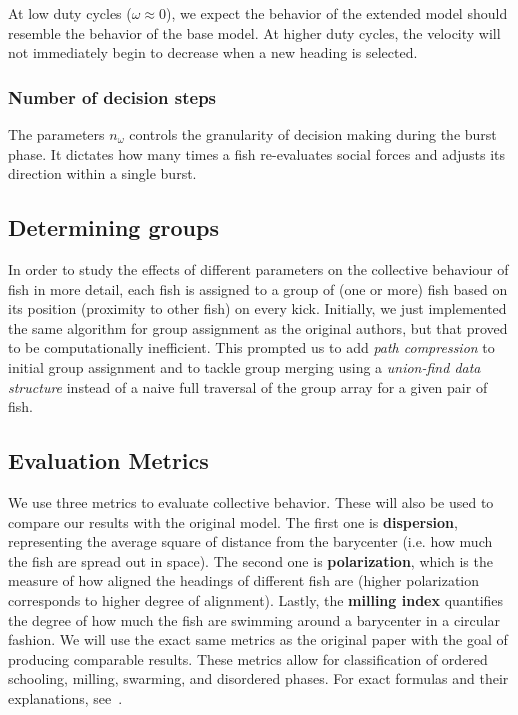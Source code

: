 At low duty cycles ($\omega\approx0$), we expect the behavior of the extended model should resemble the behavior of the base model. At higher duty cycles, the velocity will not immediately begin to decrease when a new heading is selected.

\subsubsection{Number of decision steps}

The parameters $n_\omega$ controls the granularity of decision making during the burst phase. It dictates how many times a fish re-evaluates social forces and adjusts its direction within a single burst. 

\subsection{Determining groups}
In order to study the effects of different parameters on the collective behaviour of fish in more detail, each fish is assigned to a group of (one or more) fish based on its position (proximity to other fish) on every kick.
Initially, we just implemented the same algorithm for group assignment as the original authors, but that proved to be computationally inefficient.
This prompted us to add \textit{path compression} to initial group assignment and to tackle group merging using a \textit{union-find data structure} instead of a naive full traversal of the group array for a given pair of fish.

\subsection{Evaluation Metrics}

We use three metrics to evaluate collective behavior.
These will also be used to compare our results with the original model.
The first one is \textbf{dispersion}, representing the average square of distance from the barycenter (i.e. how much the fish are spread out in space).
The second one is \textbf{polarization}, which is the measure of how aligned the headings of different fish are (higher polarization corresponds to higher degree of alignment).
Lastly, the \textbf{milling index} quantifies the degree of how much the fish are swimming around a barycenter in a circular fashion.
We will use the exact same metrics as the original paper with the goal of producing comparable results.
These metrics allow for classification of ordered schooling, milling, swarming, and disordered phases.
For exact formulas and their explanations, see~\cite{Wang2025_fish}.

